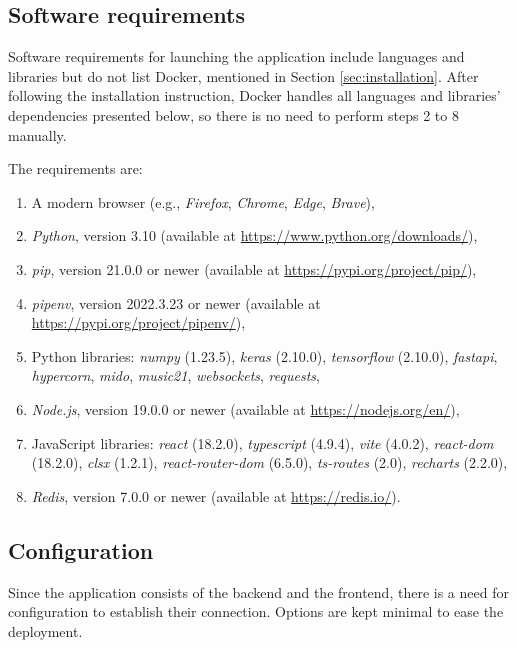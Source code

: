 \documentclass[a4paper, 11pt, twoside]{report}
\theoremstyle{definition}
\begin{document}
\subsection{Software requirements} \label{sec:software_deps}

Software requirements for launching the application include languages and libraries but do not list Docker, mentioned in Section \ref{sec:installation}. After following the installation instruction, Docker handles all languages and libraries' dependencies presented below, so there is no need to perform steps 2 to 8 manually. \par
The requirements are:

\begin{enumerate}
    \item A modern browser (e.g., \textit{Firefox}, \textit{Chrome}, \textit{Edge}, \textit{Brave}),
    \item \textit{Python}, version 3.10 (available at \url{https://www.python.org/downloads/}),
    \item \textit{pip}, version 21.0.0 or newer (available at \url{https://pypi.org/project/pip/}),
    \item \textit{pipenv}, version 2022.3.23 or newer (available at \url{https://pypi.org/project/pipenv/}),
    \item Python libraries: \textit{numpy} (1.23.5), \textit{keras} (2.10.0), \textit{tensorflow} (2.10.0), \textit{fastapi}, \textit{hypercorn}, \textit{mido}, \textit{music21}, \textit{websockets}, \textit{requests},
    \item \textit{Node.js}, version 19.0.0 or newer (available at \url{https://nodejs.org/en/}),
    \item JavaScript libraries: \textit{react} (18.2.0), \textit{typescript} (4.9.4), \textit{vite} (4.0.2), \textit{react-dom} (18.2.0), \textit{clsx} (1.2.1), \textit{react-router-dom} (6.5.0), \textit{ts-routes} (2.0), \textit{recharts} (2.2.0),
    \item \textit{Redis}, version 7.0.0 or newer (available at \url{https://redis.io/}).
\end{enumerate} \par

\subsection{Configuration}

Since the application consists of the backend and the frontend, there is a need for configuration to establish their connection. Options are kept minimal to ease the deployment. \par
\end{document}
